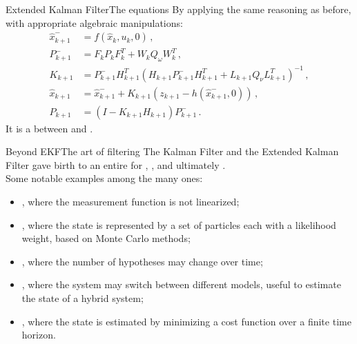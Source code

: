 \begin{frame}{Extended Kalman Filter}{The equations}
  By applying the same reasoning as before, with appropriate algebraic manipulations:
  \begin{subequations}
    \begin{align}
      \hat{x}_{k+1}^{-} &= f(\hat{x}_k,u_k,0)\,,\\
      P_{k+1}^{-} &= F_kP_kF_k^T + W_kQ_{\omega}W_k^T\,,\\
      K_{k+1} &= P_{k+1}^{-}H_{k+1}^T(H_{k+1}P_{k+1}^{-}H_{k+1}^T + L_{k+1}Q_{\nu}L_{k+1}^T)^{-1}\,,\\
      \hat{x}_{k+1} &= \hat{x}_{k+1}^{-} + K_{k+1}(z_{k+1} - h(\hat{x}_{k+1}^{-},0))\,,\\
      P_{k+1} &= (I - K_{k+1}H_{k+1})P_{k+1}^{-}\,.
    \end{align}
  \end{subequations}
  It is a  between  and .
\end{frame}

\begin{frame}{Beyond EKF}{The art of filtering}
  The Kalman Filter and the Extended Kalman Filter gave birth to an entire  for , , and ultimately .\\
  Some notable examples among the many ones:
  \begin{itemize}
    \item<1-> , where the measurement function is not linearized;
    \item<2-> , where the state is represented by a set of particles each with a likelihood weight, based on Monte Carlo methods;
    \item<3-> , where the number of hypotheses may change over time;
    \item<4-> , where the system may switch between different models, useful to estimate the state of a hybrid system;
    \item<5-> , where the state is estimated by minimizing a cost function over a finite time horizon.
  \end{itemize}
\end{frame}

